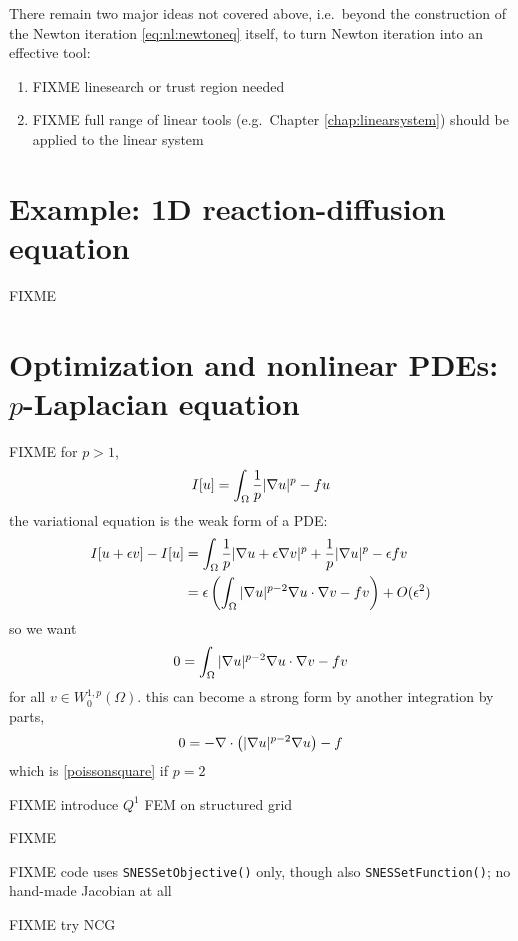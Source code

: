 
There remain two major ideas not covered above, i.e.~beyond the construction of the Newton iteration \eqref{eq:nl:newtoneq} itself, to turn Newton iteration into an effective tool:
\renewcommand{\labelenumi}{\roman{enumi})}
\begin{enumerate}
\item FIXME linesearch or trust region needed \citep{Kelley2003}
\item FIXME full range of linear tools (e.g.~Chapter \ref{chap:linearsystem}) should be applied to the linear system
\end{enumerate}


\section{Example: 1D reaction-diffusion equation}

FIXME

\vfill
{}




\section{Optimization and nonlinear PDEs: $p$-Laplacian equation}

FIXME for $p>1$,
    $$I[u] = \int_\Omega \frac{1}{p} |\nabla u|^p - fu$$
the variational equation is the weak form of a PDE:
\begin{align*}
I[u+\epsilon v] - I[u] &= \int_\Omega \frac{1}{p} |\nabla u + \epsilon \nabla v|^p + \frac{1}{p} |\nabla u|^p - \epsilon f v \\
   &= \epsilon \left(\int_\Omega |\nabla u|^{p-2} \nabla u \cdot \nabla v - f v\right) + O(\epsilon^2)
\end{align*}
so we want
    $$0 = \int_\Omega |\nabla u|^{p-2} \nabla u \cdot \nabla v - f v$$
for all $v \in W^{1,p}_0(\Omega)$.  this can become a strong form by another integration by parts,
    $$0 = - \nabla\cdot\left(|\nabla u|^{p-2} \nabla u\right) - f$$
which is \eqref{poissonsquare} if $p=2$

FIXME introduce $Q^1$ FEM on structured grid

\begin{marginfigure}

\caption{FIXME}
\label{fig:q1hat}
\end{marginfigure}

FIXME code uses \texttt{SNESSetObjective()} only, though also \texttt{SNESSetFunction()}; no hand-made Jacobian at all

FIXME try NCG
